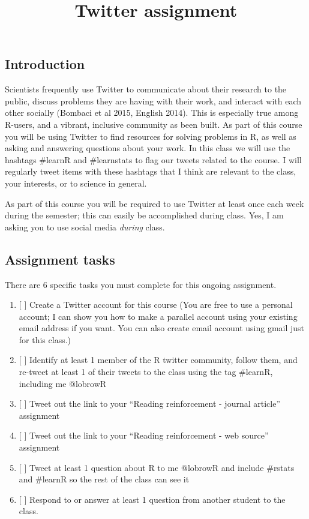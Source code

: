 \documentclass[]{article}
\title{Twitter assignment}
\author{}
\date{}
\providecommand{\tightlist}{%
  \setlength{\itemsep}{0pt}\setlength{\parskip}{0pt}}
\begin{document}
\maketitle

\subsection{Introduction}\label{introduction}

Scientists frequently use Twitter to communicate about their research to
the public, discuss problems they are having with their work, and
interact with each other socially (Bombaci et al 2015, English 2014).
This is especially true among R-users, and a vibrant, inclusive
community as been built. As part of this course you will be using
Twitter to find resources for solving problems in R, as well as asking
and answering questions about your work. In this class we will use the
hashtags \#learnR and \#learnstats to flag our tweets related to the
course. I will regularly tweet items with these hashtags that I think
are relevant to the class, your interests, or to science in general.

As part of this course you will be required to use Twitter at least once
each week during the semester; this can easily be accomplished during
class. Yes, I am asking you to use social media \emph{during} class.

\subsection{Assignment tasks}\label{assignment-tasks}

There are 6 specific tasks you must complete for this ongoing
assignment.

\begin{enumerate}
\def\labelenumi{\arabic{enumi}.}
\tightlist
\item
  {[} {]} Create a Twitter account for this course (You are free to use
  a personal account; I can show you how to make a parallel account
  using your existing email address if you want. You can also create
  email account using gmail just for this class.)
\item
  {[} {]} Identify at least 1 member of the R twitter community, follow
  them, and re-tweet at least 1 of their tweets to the class using the
  tag \#learnR, including me @lobrowR
\item
  {[} {]} Tweet out the link to your ``Reading reinforcement - journal
  article'' assignment
\item
  {[} {]} Tweet out the link to your ``Reading reinforcement - web
  source'' assignment
\item
  {[} {]} Tweet at least 1 question about R to me @lobrowR and include
  \#rstats and \#learnR so the rest of the class can see it
\item
  {[} {]} Respond to or answer at least 1 question from another student
  to the class.
\end{enumerate}
\end{document}
